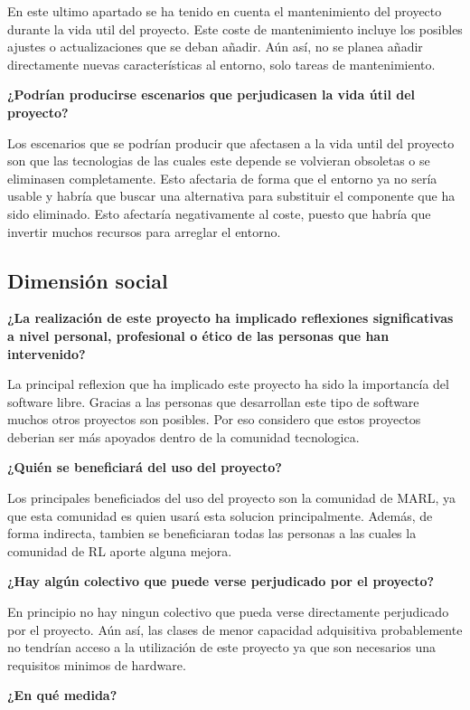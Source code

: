 En este ultimo apartado se ha tenido en cuenta el mantenimiento del proyecto durante la vida util del proyecto. Este coste de mantenimiento incluye los posibles ajustes o actualizaciones que se deban añadir. Aún así, no se planea añadir directamente nuevas características al entorno, solo tareas de mantenimiento.

\textbf{¿Podrían producirse escenarios que perjudicasen la vida útil del proyecto?}

Los escenarios que se podrían producir que afectasen a la vida until del proyecto son que las tecnologias de las cuales este depende se volvieran obsoletas o se eliminasen completamente. Esto afectaria de forma que el entorno ya no sería usable y habría que buscar una alternativa para substituir el componente que ha sido eliminado. Esto afectaría negativamente al coste, puesto que habría que invertir muchos recursos para arreglar el entorno.

\subsection{Dimensión social}

\textbf{¿La realización de este proyecto ha implicado reflexiones significativas a nivel personal, profesional o ético de las personas que han intervenido?}

La principal reflexion que ha implicado este proyecto ha sido la importancía del software libre. Gracias a las personas que desarrollan este tipo de software muchos otros proyectos son posibles. Por eso considero que estos proyectos deberian ser más apoyados dentro de la comunidad tecnologica.

\textbf{¿Quién se beneficiará del uso del proyecto?}

Los principales beneficiados del uso del proyecto son la comunidad de MARL, ya que esta comunidad es quien usará esta solucion principalmente. Además, de forma indirecta, tambien se beneficiaran todas las personas a las cuales la comunidad de RL aporte alguna mejora.

\textbf{¿Hay algún colectivo que puede verse perjudicado por el proyecto?}

En principio no hay ningun colectivo que pueda verse directamente perjudicado por el proyecto. Aún así, las clases de menor capacidad adquisitiva probablemente no tendrían acceso a la utilización de este proyecto ya que son necesarios una requisitos minimos de hardware.

\textbf{¿En qué medida?}


